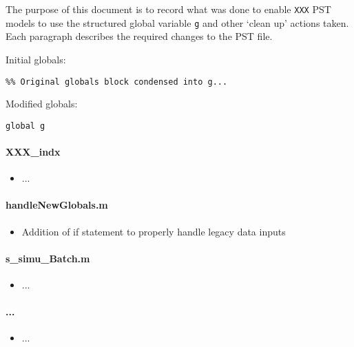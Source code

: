 \documentclass[12pt]{article}
\begin{document}
The purpose of this document is to record what was done to enable \verb|XXX| PST models to use the structured global variable \verb|g| and other `clean up' actions taken. \\
Each paragraph describes the required changes to the PST file.

Initial globals:
\begin{verbatim}
%% Original globals block condensed into g...

\end{verbatim}

Modified globals:
\begin{verbatim}
global g
\end{verbatim}

\paragraph{XXX\_indx}
	\begin{itemize}
		\item ...
	\end{itemize}

\paragraph{handleNewGlobals.m}
	\begin{itemize}
		\item Addition of if statement to properly handle legacy data inputs
	\end{itemize}


\paragraph{s\_simu\_Batch.m}
	\begin{itemize}
		\item ...
	\end{itemize}

\paragraph{...}
	\begin{itemize}
		\item ...
	\end{itemize}

\end{document}
